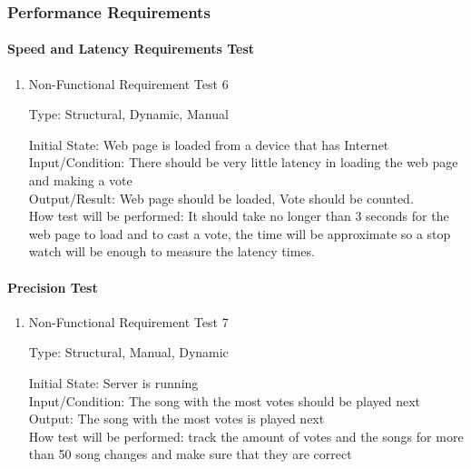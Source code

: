 \documentclass[12pt, titlepage]{article}
\begin{document}
\subsubsection{Performance Requirements}

\paragraph{Speed and Latency Requirements Test}

\begin{enumerate}

\item{ Non-Functional Requirement Test 6\\}

Type: Structural, Dynamic, Manual
					
Initial State: Web page is loaded from a device that has Internet \\
					
Input/Condition: There should be very little latency in loading the web page and making a vote \\
					
Output/Result: Web page should be loaded, Vote should be counted. \\
					
How test will be performed: It should take no longer than 3 seconds for the web page to load and to cast a vote, the time will be approximate so a stop watch will be enough to measure the latency times. \\
\end{enumerate}


\paragraph{Precision Test}

\begin{enumerate}

					
\item{Non-Functional Requirement Test 7\\}

Type: Structural, Manual, Dynamic
					
Initial State: Server is running \\
					
Input/Condition: The song with the most votes should be played next \\
					
Output: The song with the most votes is played next \\
					
How test will be performed: track the amount of votes and the songs for more than 50 song changes
and make sure that they are correct \\
\end{enumerate}
\end{document}
